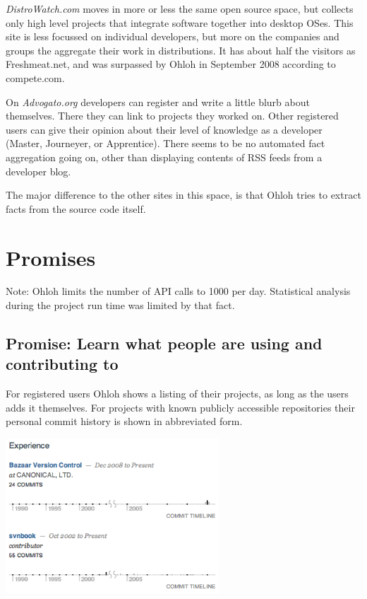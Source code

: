 \documentclass{sig-alternate}
\begin{document}
\emph{DistroWatch.com} moves in more or less the same open source space, but collects only high level projects that integrate software together into desktop OSes. This site is less focussed on individual developers, but more on the companies and groups the aggregate their work in distributions. It has about half the visitors as Freshmeat.net, and was surpassed by Ohloh in September 2008 according to compete.com.

On \emph{Advogato.org} developers can register and write a little blurb about themselves. There they can link to projects they worked on. Other registered users can give their opinion about their level of knowledge as a developer (Master, Journeyer, or Apprentice). There seems to be no automated fact aggregation going on, other than displaying contents of RSS feeds from a developer blog.

The major difference to the other sites in this space, is that Ohloh tries to extract facts from the source code itself.


\section{Promises}\label{sec:prom}

Note: Ohloh limits the number of API calls to 1000 per day. Statistical analysis during the project run time was limited by that fact.


\subsection{Promise: Learn what people are using and contributing to}

For registered users Ohloh shows a listing of their projects, as long as the users adds it themselves. For projects with known publicly accessible repositories their personal commit history is shown in abbreviated form.

\includegraphics[width=80mm]{Experience.png}
\end{document}
